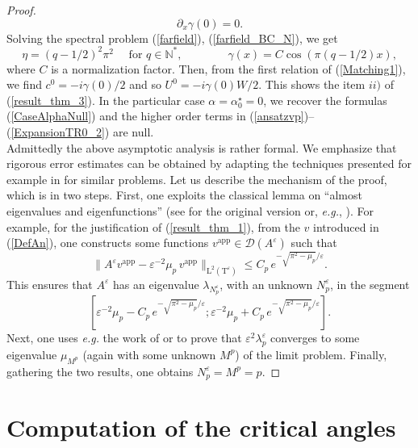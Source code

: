 \documentclass[11pt,a4paper]{article}
\newcommand{\eps}{\varepsilon}
\newcommand{\mrm}[1]{\mathrm{#1}}
\newcommand{\N}{\mathbb{N}}
\newcommand{\mL}{\mrm{L}}
\begin{document}
\begin{proof}
\begin{equation}\label{farfield_BC_N}
\partial_x\gamma(0)=0.
\end{equation}
Solving the spectral problem (\ref{farfield}), (\ref{farfield_BC_N}), we get 
\[
\eta=(q-1/2)^2\pi^2 \quad\mbox{ for }q\in\N^\ast,\qquad\qquad  \gamma(x)=C \cos(\pi(q-1/2)x),
\]
where $C$ is a normalization factor. Then, from the first relation of (\ref{Matching1}), we find $c^0=-i\gamma(0)/2$ and so $U^0=-i\gamma(0)W/2$. This shows the item $ii)$ of (\ref{result_thm_3}). In the particular case $\alpha=\alpha^\star_0=0$, we recover the formulas (\ref{CaseAlphaNull}) and the higher order terms in (\ref{ansatzvp})--(\ref{ExpansionTR0_2}) are null. \\
\newline
Admittedly the above asymptotic analysis is rather formal. We emphasize that rigorous error estimates can be obtained by adapting the techniques presented for example in \cite{Post05,Grie08,Post12,Naza17,Naza18,Naza23} for similar problems. Let us describe the mechanism of the proof, which is in two steps. First, one exploits the classical lemma on ``almost eigenvalues and eigenfunctions'' (see \cite{ViLu} for the original version or, \textit{e.g.}, \cite[Lem.\,1]{Naza23}). For example, for the justification of (\ref{result_thm_1}), from the $v$ introduced in (\ref{DefAn}), one constructs some functions $v^{\mrm{app}}\in \mathcal{D}(A^\eps)$ such that
\[
\|A^\eps v^{\mrm{app}}-\eps^{-2}\mu_p\, v^{\mrm{app}}\|_{\mL^2(\mathrm{T}^\eps)} \le  C_p\,e^{-\sqrt{\pi^2-\mu_p}/\eps}.
\]
This ensures that $A^\eps$ has an eigenvalue $\lambda_{N^\eps_p}$, with an unknown $N^\eps_p$, in the segment 
\[
[\eps^{-2}\mu_p-C_p\,e^{-\sqrt{\pi^2-\mu_p}/\eps};\eps^{-2}\mu_p+C_p\,e^{-\sqrt{\pi^2-\mu_p}/\eps}].
\]
Next, one uses \textit{e.g.} the work of \cite{Grie08} or \cite{Post12} to prove that $\eps^2\lambda_p^\eps$ converges to some eigenvalue $\mu_{M^p}$ (again with some unknown $M^p$) of the limit problem. Finally, gathering the two results, one obtains $N^\eps_p=M^p=p$. 
\end{proof}




\section{Computation of the critical angles}\label{SectionNumericalResults}
\end{document}
